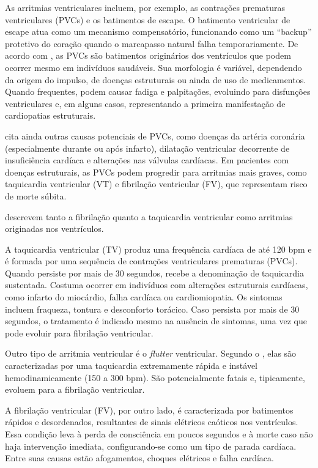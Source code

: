As arritmias ventriculares incluem, por exemplo, as contrações prematuras ventriculares (PVCs) e os batimentos de escape. 
O batimento ventricular de escape atua como um mecanismo compensatório, funcionando como um “backup” protetivo do coração quando o marcapasso natural falha temporariamente.
De acordo com , as PVCs são batimentos originários dos ventrículos que podem ocorrer mesmo em indivíduos saudáveis. Sua morfologia é variável, dependendo da origem do impulso, de doenças estruturais ou ainda de uso de medicamentos. Quando frequentes, podem causar fadiga e palpitações, evoluindo para disfunções ventriculares e, em alguns casos, representando a primeira manifestação de cardiopatias estruturais.

 cita ainda outras causas potenciais de PVCs, como doenças da artéria coronária (especialmente durante ou após infarto), dilatação ventricular decorrente de insuficiência cardíaca e alterações nas válvulas cardíacas. Em pacientes com doenças estruturais, as PVCs podem progredir para arritmias mais graves, como taquicardia ventricular (VT) e fibrilação ventricular (FV), que representam risco de morte súbita.

 descrevem tanto a fibrilação quanto a taquicardia ventricular como arritmias originadas nos ventrículos.

A taquicardia ventricular (TV) produz uma frequência cardíaca de até 120 bpm e é formada por uma sequência de contrações ventriculares prematuras (PVCs). Quando persiste por mais de 30 segundos, recebe a denominação de taquicardia sustentada. Costuma ocorrer em indivíduos com alterações estruturais cardíacas, como infarto do miocárdio, falha cardíaca ou cardiomiopatia. Os sintomas incluem fraqueza, tontura e desconforto torácico. Caso persista por mais de 30 segundos, o tratamento é indicado mesmo na ausência de sintomas, uma vez que pode evoluir para fibrilação ventricular.

Outro tipo de arritmia ventricular é o \textit{flutter} ventricular. Segundo o , elas são caracterizadas por uma taquicardia extremamente rápida e instável hemodinamicamente (150 a 300 bpm).
São potencialmente fatais e, tipicamente, evoluem para a fibrilação ventricular.

A fibrilação ventricular (FV), por outro lado, é caracterizada por batimentos rápidos e desordenados, resultantes de sinais elétricos caóticos nos ventrículos. Essa condição leva à perda de consciência em poucos segundos e à morte caso não haja intervenção imediata, configurando-se como um tipo de parada cardíaca. Entre suas causas estão afogamentos, choques elétricos e falha cardíaca.

